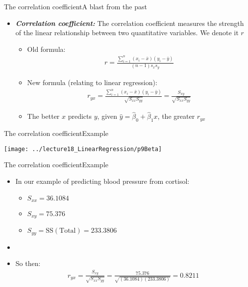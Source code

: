 \documentclass[xcolor=dvipsnames]{beamer}
\begin{document}
\begin{frame}{The correlation coefficient}{A blast from the past}
	\begin{itemize}
		\item \textbf{\emph{Correlation coefficient:}} The correlation coefficient measures the strength of the linear relationship between two quantitative variables. We denote it $r$
		\begin{itemize}
					\item Old formula: 
			\begin{gather*}
			r = \frac{\sum_{i=1}^n(x_i -\bar{x})(y_i - \bar{y})}{(n-1) s_x s_y}
			\end{gather*}
			\item New formula (relating to linear regression):
			\begin{gather*}
			r_{yx} = \frac{\sum_{i = 1}^n (x_i - \bar{x})(y_i - \bar{y})}{\sqrt{S_{xx}S_{yy}}} = \frac{S_{xy}}{\sqrt{S_{xx}S_{yy}}}
			\end{gather*}
			\item The better $x$ predicts $y$, given $\hat{y}=\hat{\beta}_0 + \hat{\beta}_1 x$, the greater $r_{yx}$
		\end{itemize}
	\end{itemize}
\end{frame}

\begin{frame}{The correlation coefficient}{Example}
	\begin{center}
		\texttt{[image: ../lecture18\_LinearRegression/p9Beta]}
	\end{center}
\end{frame}

\begin{frame}{The correlation coefficient}{Example}
	\begin{itemize}
	\item In our example of predicting blood pressure from cortisol:
	\begin{itemize}
		\item $S_{xx} = 36.1084$
		\item $S_{xy} = 75.376$
		\item $S_{yy} = \text{SS}(\text{Total}) = 233.3806$
	\end{itemize}
	\item[]
		\item So then:
		\begin{gather*}
		r_{yx} = \frac{S_{xy}}{\sqrt{S_{xx}S_{yy}}} = \frac{75.376}{\sqrt{(36.1084)(233.3806)}} = 0.8211
		\end{gather*}
	\end{itemize}
\end{frame}
\end{document}
